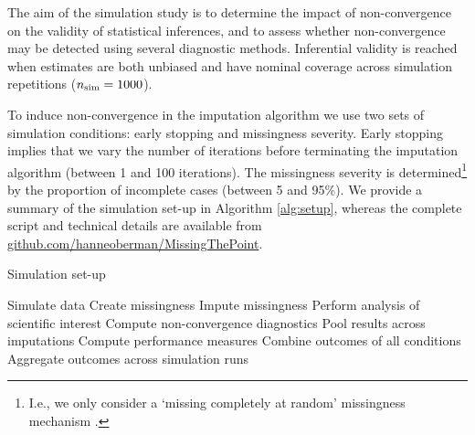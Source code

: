 \documentclass{article}
\begin{document}
The aim of the simulation study is to determine the impact of non-convergence on the validity of statistical inferences, and to assess whether non-convergence may be detected using several diagnostic methods. Inferential validity is reached when estimates are both unbiased and have nominal coverage across simulation repetitions ($n_{\rm sim}=1000$).

To induce non-convergence in the imputation algorithm we use  two sets of simulation conditions: early stopping and missingness severity. Early stopping implies that we vary the number of iterations before terminating the imputation algorithm (between 1 and 100 iterations). The missingness severity is determined\footnote{I.e., we only consider a `missing completely at random' missingness mechanism \citep{rubin76}.} by the proportion of incomplete cases (between 5 and 95\%). We provide a summary of the simulation set-up in Algorithm \ref{alg:setup}, whereas the complete script and technical details are available from \href{https://github.com/hanneoberman/MissingThePoint}{github.com/hanneoberman/MissingThePoint}. 

\begin{algorithm}
   \caption{Simulation set-up}
   \label{alg:setup}
\begin{algorithmic}
\STATE Simulate data 
\REPEAT 
  \STATE Create missingness
   \STATE Impute missingness
   \STATE Perform analysis of scientific interest
   \STATE Compute non-convergence diagnostics 
   \STATE Pool results across imputations
   \STATE Compute performance measures
   \ENDFOR
 \ENDFOR 
 \STATE Combine outcomes of all conditions
\STATE Aggregate outcomes across simulation runs
\end{algorithmic}
\end{algorithm}


% 
% 
% 
% 
% 
\end{document}
